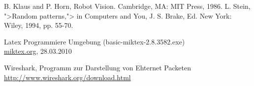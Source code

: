 %
%

\begin{thebibliography}{99}
\label{cha:literaturverzeichnis}


 B. Klaus and P. Horn, Robot Vision. Cambridge, MA: MIT Press, 1986.
 L. Stein, ">Random patterns,"> in Computers and You, J. S. Brake, Ed. New York: Wiley, 1994, pp. 55-70.






 Latex Programmiere Umgebung (basic-miktex-2.8.3582.exe)\\
\href{http://www.miktex.org/about}{miktex.org}, 28.03.2010

Wireshark, Programm zur Darstellung von Ehternet Packeten\\
\href{http://www.wireshark.org/download.html}{http://www.wireshark.org/download.html}



\end{thebibliography}

